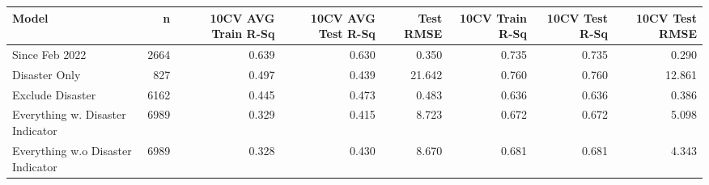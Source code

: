 
\begin{tabular}{l|r|r|r|r|r|r|r}
\hline
Model & n & 10CV AVG Train R-Sq & 10CV AVG Test R-Sq & Test RMSE & 10CV Train R-Sq & 10CV Test R-Sq & 10CV Test RMSE\\
\hline
Since Feb 2022 & 2664 & 0.639 & 0.630 & 0.350 & 0.735 & 0.735 & 0.290\\
\hline
Disaster Only & 827 & 0.497 & 0.439 & 21.642 & 0.760 & 0.760 & 12.861\\
\hline
Exclude Disaster & 6162 & 0.445 & 0.473 & 0.483 & 0.636 & 0.636 & 0.386\\
\hline
Everything w. Disaster Indicator & 6989 & 0.329 & 0.415 & 8.723 & 0.672 & 0.672 & 5.098\\
\hline
Everything w.o Disaster Indicator & 6989 & 0.328 & 0.430 & 8.670 & 0.681 & 0.681 & 4.343\\
\hline
\end{tabular}
